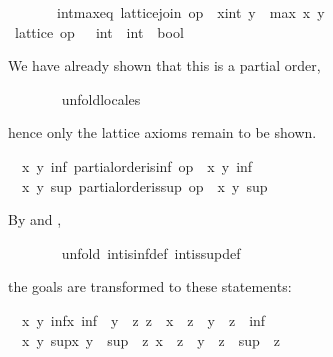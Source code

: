 \begin{isabellebody}
\ \ \ \ \ \ \ int{\isacharunderscore}max{\isacharunderscore}eq{\isacharcolon}\ {\isachardoublequoteopen}lattice{\isachardot}join\ op\ {\isasymle}\ {\isacharparenleft}x{\isacharcolon}{\isacharcolon}int{\isacharparenright}\ y\ {\isacharequal}\ max\ x\ y{\isachardoublequoteclose}\isanewline
\ \ \isamarkupfalse%
\ {\isacharminus}\isanewline
\ \ \ \ \isamarkupfalse%
\ {\isachardoublequoteopen}lattice\ {\isacharparenleft}op\ {\isasymle}\ {\isacharcolon}{\isacharcolon}\ int\ {\isasymRightarrow}\ int\ {\isasymRightarrow}\ bool{\isacharparenright}{\isachardoublequoteclose}%
\begin{isamarkuptxt}%
\normalsize We have already shown that this is a partial
	order,%
\end{isamarkuptxt}%
\isamarkuptrue%
\ \ \ \ \ \ \isamarkupfalse%
\ unfold{\isacharunderscore}locales%
\begin{isamarkuptxt}%
\normalsize hence only the lattice axioms remain to be
	shown.
        \begin{isabelle}%
\ {}{\isachardot}\ {\isasymAnd}x\ y{\isachardot}\ {\isasymexists}inf{\isachardot}\ partial{\isacharunderscore}order{\isachardot}is{\isacharunderscore}inf\ op\ {\isasymle}\ x\ y\ inf\isanewline
\ {}{\isachardot}\ {\isasymAnd}x\ y{\isachardot}\ {\isasymexists}sup{\isachardot}\ partial{\isacharunderscore}order{\isachardot}is{\isacharunderscore}sup\ op\ {\isasymle}\ x\ y\ sup%
\end{isabelle}
	By  and ,%
\end{isamarkuptxt}%
\isamarkuptrue%
\ \ \ \ \ \ \isamarkupfalse%
\ {\isacharparenleft}unfold\ int{\isachardot}is{\isacharunderscore}inf{\isacharunderscore}def\ int{\isachardot}is{\isacharunderscore}sup{\isacharunderscore}def{\isacharparenright}%
\begin{isamarkuptxt}%
\normalsize the goals are transformed to these
	statements:
	\begin{isabelle}%
\ {}{\isachardot}\ {\isasymAnd}x\ y{\isachardot}\ {\isasymexists}inf{\isasymle}x{\isachardot}\ inf\ {\isasymle}\ y\ {\isasymand}\ {\isacharparenleft}{\isasymforall}z{\isachardot}\ z\ {\isasymle}\ x\ {\isasymand}\ z\ {\isasymle}\ y\ {\isasymlongrightarrow}\ z\ {\isasymle}\ inf{\isacharparenright}\isanewline
\ {}{\isachardot}\ {\isasymAnd}x\ y{\isachardot}\ {\isasymexists}sup{\isasymge}x{\isachardot}\ y\ {\isasymle}\ sup\ {\isasymand}\ {\isacharparenleft}{\isasymforall}z{\isachardot}\ x\ {\isasymle}\ z\ {\isasymand}\ y\ {\isasymle}\ z\ {\isasymlongrightarrow}\ sup\ {\isasymle}\ z{\isacharparenright}%

\end{isabelle}
\end{isamarkuptxt}
\end{isabellebody}
